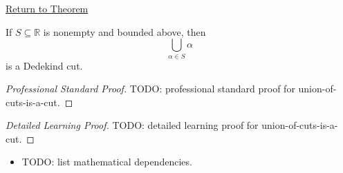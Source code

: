 \newpage
{}
\label{prf:union-of-cuts-is-a-cut}

\begin{remark*}[Return]
\hyperref[lem:union-of-cuts-is-a-cut]{Return to Theorem}
\end{remark*}

\begin{lemma*}
If $S\subseteq\mathbb{R}$ is nonempty and bounded above, then
\[
\bigcup_{\alpha\in S}\alpha
\]
is a Dedekind cut.
\end{lemma*}

\begin{proof}[Professional Standard Proof]
\LRAProofBodyStart
TODO: professional standard proof for union-of-cuts-is-a-cut.
\end{proof}

\begin{proof}[Detailed Learning Proof]
\LRAProofBodyStart
TODO: detailed learning proof for union-of-cuts-is-a-cut.
\end{proof}

\begin{remark*}
\end{remark*}

\begin{dependencies}
\begin{itemize}
  \item TODO: list mathematical dependencies.
\end{itemize}
\end{dependencies}

\clearpage
